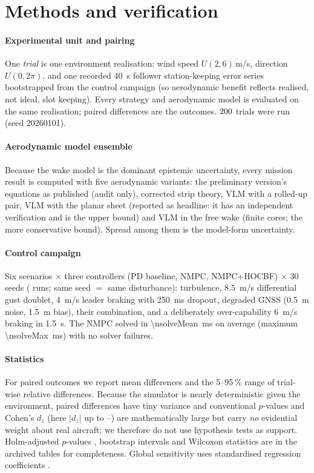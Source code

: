 \documentclass[preprint,12pt]{elsarticle}
\begin{document}


\section{Methods and verification}\label{sec:methods}
\paragraph{Experimental unit and pairing} One \emph{trial} is one environment realisation: wind speed $U(2,6)$\,m/s, direction $U(0,2\pi)$, and one recorded \SI{40}{s} follower station-keeping error series bootstrapped from the control campaign (so aerodynamic benefit reflects realised, not ideal, slot keeping). Every strategy and aerodynamic model is evaluated on the same realisation; paired differences are the outcomes. $200$ trials were run (seed 20260101).

\paragraph{Aerodynamic model ensemble} Because the wake model is the dominant epistemic uncertainty, every mission result is computed with five aerodynamic variants: the preliminary version's equations as published (audit only), corrected strip theory, VLM with a rolled-up pair, VLM with the planar sheet (reported as headline: it has an independent verification and is the upper bound) and VLM in the free wake (finite cores; the more conservative bound). Spread among them is the model-form uncertainty.

\paragraph{Control campaign} Six scenarios $\times$ three controllers (PD baseline, NMPC, NMPC+HOCBF) $\times$ 30 seeds (\nnControl{} runs; same seed $=$ same disturbance): turbulence, \SI{8.5}{m/s} differential gust doublet, \SI{4}{m/s} leader braking with \SI{250}{ms} dropout, degraded GNSS (\SI{0.5}{m} noise, \SI{1.5}{m} bias), their combination, and a deliberately over-capability \SI{6}{m/s} braking in \SI{1.5}{s}. The NMPC solved in \SI{\nsolveMean}{ms} on average (maximum \SI{\nsolveMax}{ms}) with no solver failures.

\paragraph{Statistics} For paired outcomes we report mean differences and the 5--95\,\% range of trial-wise relative differences. Because the simulator is nearly deterministic given the environment, paired differences have tiny variance and conventional $p$-values and Cohen's $d_z$ (here $|d_z|$ up to \ndzA--\ndzC) are mathematically large but carry \emph{no} evidential weight about real aircraft; we therefore do not use hypothesis tests as support. Holm-adjusted $p$-values \cite{holm1979}, bootstrap intervals \cite{efron1993} and Wilcoxon statistics are in the archived tables for completeness. Global sensitivity uses standardised regression coefficients \cite{saltelli2008}.
\end{document}
